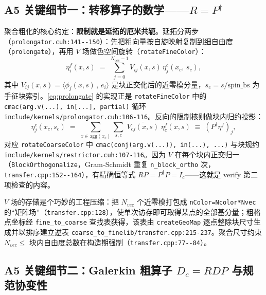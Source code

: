\documentclass[UTF8]{ctexart}
\begin{document}
\subsection{A5 关键细节一：转移算子的数学——$R=P^\dagger$}

聚合粗化的核心约定：\textbf{限制就是延拓的厄米共轭}。延拓分两步（\textcolor{evidence}{\texttt{\nolinkurl{prolongator.cuh:141--150}}}）：先把粗向量按自旋映射复制到细自由度（\texttt{prolongate}），再用 $V$ 场做色空间旋转（\texttt{rotateFineColor}）：
\begin{equation}
\eta^f_i(x,s) \;=\; \sum_{j=0}^{N_{vec}-1} V_{ij}(x,s)\,\eta^c_j(x_c,\,s_c),
\label{eq:prolongate}
\end{equation}
其中 $V_{ij}(x,s)=\langle \phi_j(x,s)\,,\,e_i\rangle$ 是块正交化后的近零模分量，$s_c=s/\text{spin\_bs}$ 为手征块索引。\eqref{eq:prolongate} 的实现正是 \texttt{rotateFineColor} 中的 \texttt{cmac(arg.v(...), in[...], partial)} 循环\textcolor{evidence}{\texttt{\nolinkurl{include/kernels/prolongator.cuh:106-116}}}。反向的限制核则做块内归约投影：
\begin{equation}
\eta^c_j(x_c,s_c) \;=\; \sum_{x\in\text{agg}(x_c)}\sum_{s,c}\;\overline{V_{cj}(x,s)}\;\eta^f_c(x,s)\;\equiv\;(P^\dagger\eta^f)_j,
\label{eq:restrict}
\end{equation}
对应 \texttt{rotateCoarseColor} 中 \texttt{cmac(conj(arg.v(...)), in(...), ...)} 与块规约\textcolor{evidence}{\texttt{\nolinkurl{include/kernels/restrictor.cuh:107-116}}}。因为 $V$ 在每个块内正交归一（\texttt{BlockOrthogonalize}，Gram-Schmidt 重复 \texttt{n\_block\_ortho} 次，\textcolor{evidence}{\texttt{\nolinkurl{transfer.cpp:152--164}}}），有精确恒等式 $RP=P^\dagger P=I_c$——这就是 verify 第二项检查的内容。

$V$ 场的存储是个巧妙的工程压缩：把 $N_{vec}$ 个近零模打包成 \texttt{nColor=Ncolor*Nvec} 的``矩阵场''（\textcolor{evidence}{\texttt{\nolinkurl{transfer.cpp:128}}}），使单次访存即可取得某点的全部基分量；粗格点坐标经 \texttt{fine\_to\_coarse} 查找表获得，该表由 \texttt{createGeoMap} 逐点整除块尺寸生成并以排序建立逆表 \texttt{coarse\_to\_fine}\textcolor{evidence}{\texttt{\nolinkurl{lib/transfer.cpp:215-237}}}。聚合尺寸约束 $N_{vec}\le$ 块内自由度总数在构造期强制（\textcolor{evidence}{\texttt{\nolinkurl{transfer.cpp:77--84}}}）。

\subsection{A5 关键细节二：Galerkin 粗算子 $D_c=RDP$ 与规范协变性}
\end{document}
